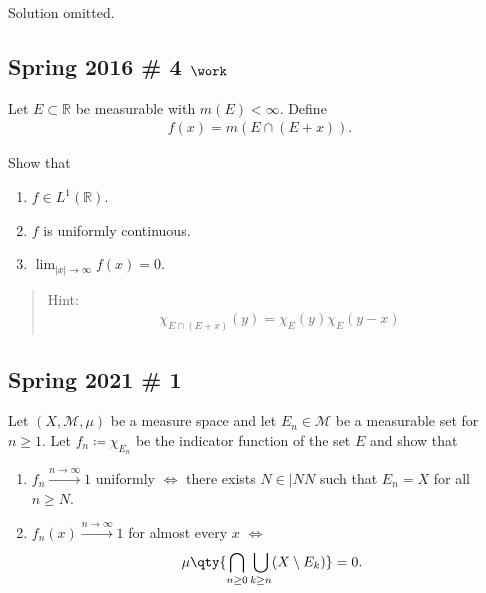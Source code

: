 
Solution omitted.

\hypertarget{spring-2016-4-work}{%
\subsection{\texorpdfstring{Spring 2016 \# 4
\(\work\)}{Spring 2016 \# 4 \textbackslash work}}\label{spring-2016-4-work}}

Let \(E \subset {\mathbb{R}}\) be measurable with \(m(E) < \infty\).
Define
\begin{align*}
f(x)=m(E \cap(E+x)).
\end{align*}

Show that

\begin{enumerate}
\def\labelenumi{\arabic{enumi}.}
\tightlist
\item
  \(f\in L^1({\mathbb{R}})\).
\item
  \(f\) is uniformly continuous.
\item
  \(\lim _{|x| \to \infty} f(x) = 0\).
\end{enumerate}

\begin{quote}
Hint:
\begin{align*}
\chi_{E \cap(E+x)}(y)=\chi_{E}(y) \chi_{E}(y-x)
\end{align*}
\end{quote}

\hypertarget{spring-2021-1}{%
\subsection{Spring 2021 \# 1}\label{spring-2021-1}}

Let \((X, \mathcal{M},\mu)\) be a measure space and let
\(E_n \in \mathcal{M}\) be a measurable set for \(n\geq 1\). Let
\(f_n \coloneqq\chi_{E_n}\) be the indicator function of the set \(E\)
and show that

\begin{enumerate}
\def\labelenumi{\alph{enumi}.}
\item
  \(f_n \overset{n\to\infty}\to 1\) uniformly \(\iff\) there exists
  \(N\in |NN\) such that \(E_n = X\) for all \(n\geq N\).
\item
  \(f_n(x) \overset{n\to\infty}\to 1\) for almost every \(x\) \(\iff\)
  \begin{align*}
  \mu \qty{ \bigcap_{n \geq 0} \bigcup_{k \geq n} (X \setminus E_k) } = 0
  .\end{align*}
\end{enumerate}

